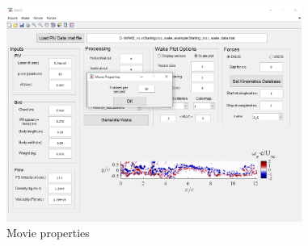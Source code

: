 \documentclass[12pt,a4paper]{article}
\begin{document}
\begin{figure}[ht!]
	\centering
	\includegraphics[width=0.86\textwidth]{movie-properties}
	\caption{Movie properties}
	\label{fig:GUI-movie-properties}
\end{figure}

\newpage
\end{document}
